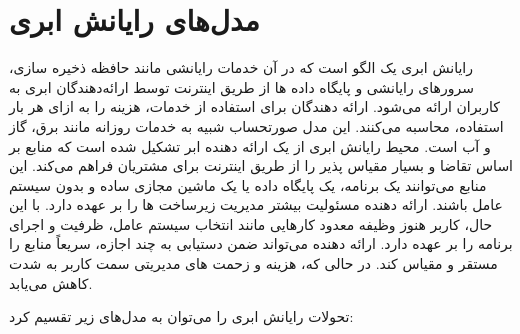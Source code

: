 \section{مدل‌های رایانش ابری}

رایانش ابری یک الگو است که در آن خدمات رایانشی مانند حافظه ذخیره سازی، سرورهای رایانشی و پایگاه داده ها از طریق اینترنت توسط ارائه‌دهندگان ابری به کاربران ارائه می‌شود. ارائه دهندگان برای استفاده از خدمات، هزینه را به ازای هر بار استفاده، محاسبه می‌کنند. این مدل صورتحساب شبیه به خدمات روزانه مانند برق، گاز و آب است. محیط رایانش ابری از یک ارائه دهنده ابر تشکیل شده است که منابع بر اساس تقاضا و بسیار مقیاس پذیر را از طریق اینترنت برای مشتریان فراهم می‌کند. این منابع می‌توانند یک برنامه، یک پایگاه داده یا یک ماشین مجازی ساده و بدون سیستم عامل باشند. ارائه دهنده مسئولیت بیشتر مدیریت زیرساخت ها را بر عهده دارد. با این حال، کاربر هنوز وظیفه معدود کارهایی مانند انتخاب سیستم عامل، ظرفیت و اجرای برنامه را بر عهده دارد. ارائه دهنده می‌تواند ضمن دستیابی به چند اجازه، سریعاً منابع را مستقر و مقیاس کند. در حالی که، هزینه و زحمت های مدیریتی سمت کاربر به شدت کاهش می‌یابد.

تحولات رایانش ابری را می‌توان به مدل‌های زیر تقسیم کرد:

